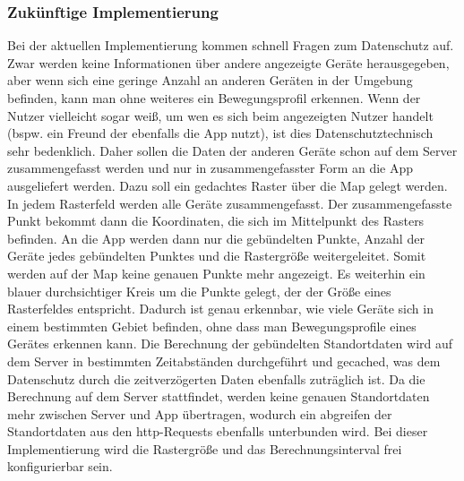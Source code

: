 \subsubsection{Zukünftige Implementierung}
Bei der aktuellen Implementierung kommen schnell Fragen zum Datenschutz auf. Zwar werden keine Informationen über andere angezeigte Geräte herausgegeben, aber wenn sich eine geringe Anzahl an anderen Geräten in der Umgebung befinden, kann man ohne weiteres ein Bewegungsprofil erkennen. Wenn der Nutzer vielleicht sogar weiß, um wen es sich beim angezeigten Nutzer handelt (bspw. ein Freund der ebenfalls die App nutzt), ist dies Datenschutztechnisch sehr bedenklich. Daher sollen die Daten der anderen Geräte schon auf dem Server zusammengefasst werden und nur in zusammengefasster Form an die App ausgeliefert werden. Dazu soll ein gedachtes Raster über die Map gelegt werden. In jedem Rasterfeld werden alle Geräte zusammengefasst. Der zusammengefasste Punkt bekommt dann die Koordinaten, die sich im Mittelpunkt des Rasters befinden. An die App werden dann nur die gebündelten Punkte, Anzahl der Geräte jedes gebündelten Punktes und die Rastergröße weitergeleitet. Somit werden auf der Map keine genauen Punkte mehr angezeigt. Es weiterhin ein blauer durchsichtiger Kreis um die Punkte gelegt, der der Größe eines Rasterfeldes entspricht. Dadurch ist genau erkennbar, wie viele Geräte sich in einem bestimmten Gebiet befinden, ohne dass man Bewegungsprofile eines Gerätes erkennen kann. Die Berechnung der gebündelten Standortdaten wird auf dem Server in bestimmten Zeitabständen durchgeführt und gecached, was dem Datenschutz durch die zeitverzögerten Daten ebenfalls zuträglich ist. Da die Berechnung auf dem Server stattfindet, werden keine genauen Standortdaten mehr zwischen Server und App übertragen, wodurch ein abgreifen der Standortdaten aus den http-Requests ebenfalls unterbunden wird. Bei dieser Implementierung wird die Rastergröße und das Berechnungsinterval frei konfigurierbar sein.
